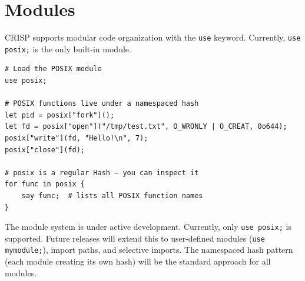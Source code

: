 \section{Modules}

CRISP supports modular code organization with the \texttt{use} keyword. Currently, \texttt{use posix;} is the only built-in module.

\begin{tcolorbox}[colback=codebg, colframe=darkpurple, colbacktitle=darkpurple, title=\textbf{\textcolor{codegold}{Modules}}, fonttitle=\bfseries, sharp corners]
\begin{lstlisting}
# Load the POSIX module
use posix;

# POSIX functions live under a namespaced hash
let pid = posix["fork"]();
let fd = posix["open"]("/tmp/test.txt", O_WRONLY | O_CREAT, 0o644);
posix["write"](fd, "Hello!\n", 7);
posix["close"](fd);

# posix is a regular Hash — you can inspect it
for func in posix {
    say func;  # lists all POSIX function names
}
\end{lstlisting}
\end{tcolorbox}

\begin{tcolorbox}[colback=lightlavender, colframe=softvioletdark, title=\textbf{\textcolor{darkpurple}{Design Note: Module System}}, fonttitle=\bfseries, sharp corners]
The module system is under active development. Currently, only \texttt{use posix;} is supported. Future releases will extend this to user-defined modules (\texttt{use mymodule;}), import paths, and selective imports. The namespaced hash pattern (each module creating its own hash) will be the standard approach for all modules.
\end{tcolorbox}
